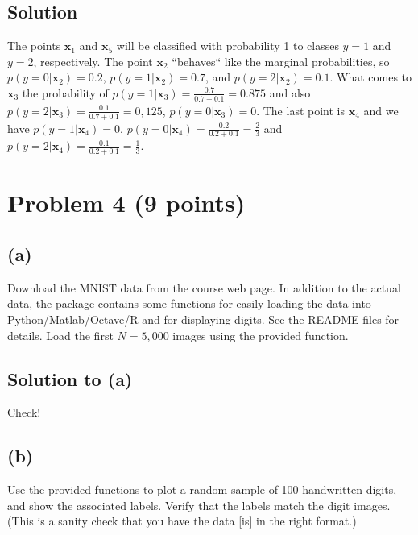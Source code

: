 \documentclass[10pt]{article}
\begin{document}
\subsection*{Solution}
The points $\mathbf{x}_1$ and $\mathbf{x}_5$ will be classified with probability 1 to classes $y = 1$ and $y = 2$, respectively. The point $\mathbf{x}_2$ ``behaves`` like the marginal probabilities, so $p(y = 0 | \mathbf{x}_2) = 0.2$, $p(y = 1 | \mathbf{x}_2) = 0.7$, and $p(y = 2 | \mathbf{x}_2) = 0.1$. What comes to $\mathbf{x}_3$ the probability of $p(y = 1 | \mathbf{x}_3) = \frac{0.7}{0.7 + 0.1} = 0.875$ and also $p(y = 2 | \mathbf{x}_3 )= \frac{0.1}{0.7 + 0.1} = 0,125$, $p(y = 0 | \mathbf{x}_3) = 0$. The last point is $\mathbf{x}_4$ and we have $p(y = 1 | \mathbf{x}_4) = 0$, $p(y = 0 | \mathbf{x}_4) = \frac{0.2}{0.2 + 0.1} = \frac{2}{3}$ and $p(y = 2 | \mathbf{x}_4) = \frac{0.1}{0.2 + 0.1} = \frac{1}{3}$.

\section*{Problem 4 (9 points)}
\subsection*{(a)}
\color{blue}
Download the MNIST data from the course web page. In addition to the actual data, the package contains some functions for easily loading the data into Python/Matlab/Octave/R and for displaying digits. See the README files for details. Load the first $N=5,000$ images using the provided function.
\color{black}

\subsection*{Solution to (a)} 
Check!

\subsection*{(b)}
\color{blue}
Use the provided functions to plot a random sample of 100 handwritten digits, and show the associated labels. Verify that the labels match the digit images. (This is a sanity check that you have the data [is] in the right format.)
\color{black}
\end{document}
